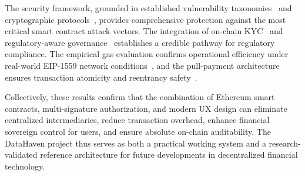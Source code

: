 \documentclass[conference]{IEEEtran}
\begin{document}
The security framework, grounded in established vulnerability
taxonomies~\cite{ref11,ref15,ref19} and cryptographic
protocols~\cite{ref2,ref4,ref17}, provides comprehensive protection against the
most critical smart contract attack vectors. The integration of on-chain
KYC~\cite{ref20,ref21} and regulatory-aware governance~\cite{ref5,ref16}
establishes a credible pathway for regulatory compliance. The empirical gas
evaluation confirms operational efficiency under real-world EIP-1559 network
conditions~\cite{ref10,ref14}, and the pull-payment architecture~\cite{ref13}
ensures transaction atomicity and reentrancy safety~\cite{ref9}.

Collectively, these results confirm that the combination of Ethereum smart
contracts, multi-signature authorization, and modern UX design can eliminate
centralized intermediaries, reduce transaction overhead, enhance financial
sovereign control for users, and ensure absolute on-chain auditability. The
DataHaven project thus serves as both a practical working system and a
research-validated reference architecture for future developments in
decentralized financial technology.
\end{document}
